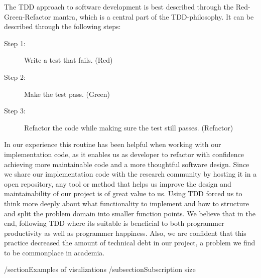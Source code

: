 The TDD approach to software development is best described through the
Red-Green-Refactor mantra, which is a central part of the
TDD-philosophy. It can be described through the following steps:

\begin{description}
    \item[Step 1:] Write a test that fails. (Red)
    \item[Step 2:] Make the test pass. (Green)
    \item[Step 3:] Refactor the code while making sure the test
        still passes. (Refactor)
\end{description}

In our experience this routine has been helpful when working
with our implementation code, as it enables us as developer to
refactor with confidence achieving more maintainable code and a
more thoughtful software design. Since we share our
implementation code with the research community by hosting it in
a open repository, any tool or method that helps us improve the
design and maintainability of our project is of great value to
us. Using TDD forced us to think more deeply about what
functionality to implement and how to structure and split the
problem domain into smaller function points. We believe that in
the end, following TDD where its suitable is beneficial to both
programmer productivity as well as programmer happiness. Also,
we are confident that this practice decreased the amount of
technical debt in our project, a problem we find to be commonplace in academia.

/section{Examples of visulizations}
/subsection{Subscription size}
